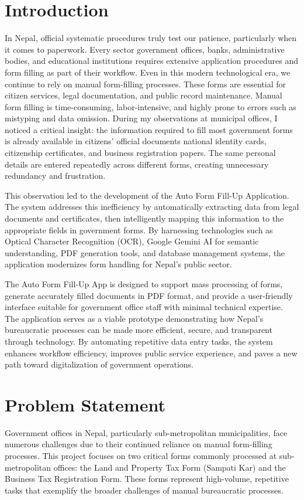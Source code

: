 \documentclass[12pt]{report}
\begin{document}
\section{Introduction}
In Nepal, official systematic procedures truly test our patience, 
particularly when it comes to paperwork. Every sector government 
offices, banks, administrative bodies, and educational institutions
requires extensive application procedures and form filling as part 
of their workflow. Even in this modern technological era, we continue 
to rely on manual form-filling processes. These forms are essential 
for citizen services, legal documentation, and public record maintenance.
Manual form filling is time-consuming, labor-intensive, and highly 
prone to errors such as mistyping and data omission. During my 
observations at municipal offices, I noticed a critical insight: 
the information required to fill most government forms is already 
available in citizens' official documents national identity cards, 
citizenship certificates, and business registration papers. The same 
personal details are entered repeatedly across different forms, 
creating unnecessary redundancy and frustration.

This observation led to the development of the Auto Form Fill-Up 
Application. The system addresses this inefficiency by automatically 
extracting data from legal documents and certificates, then intelligently 
mapping this information to the appropriate fields in government forms. 
By harnessing technologies such as Optical Character Recognition (OCR), 
Google Gemini AI for semantic understanding, PDF generation tools, and 
database management systems, the application modernizes form handling 
for Nepal's public sector.

The Auto Form Fill-Up App is designed to support mass processing of 
forms, generate accurately filled documents in PDF format, and provide 
a user-friendly interface suitable for government office staff with 
minimal technical expertise. The application serves as a viable prototype 
demonstrating how Nepal's bureaucratic processes can be made more 
efficient, secure, and transparent through technology. By automating 
repetitive data entry tasks, the system enhances workflow efficiency, 
improves public service experience, and paves a new path toward 
digitalization of government operations.


\section{Problem Statement}
Government offices in Nepal, particularly sub-metropolitan municipalities, face 
numerous challenges due to their continued reliance on manual form-filling 
processes. This project focuses on two critical forms commonly processed at 
sub-metropolitan offices: the Land and Property Tax Form (Sampati Kar) and the 
Business Tax Registration Form. These forms represent high-volume, repetitive 
tasks that exemplify the broader challenges of manual bureaucratic processes.
\end{document}
